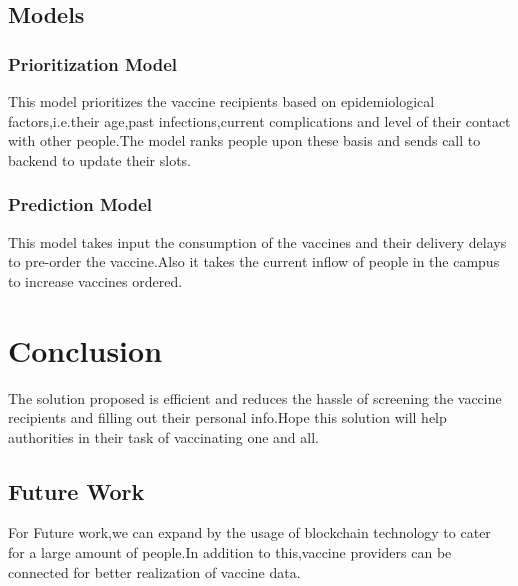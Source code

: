 \documentclass[10pt,twocolumn,letterpaper]{article}
\begin{document}
\subsection{Models}
\subsubsection{Prioritization Model}
This model prioritizes the vaccine recipients based on epidemiological factors,i.e.their age,past infections,current complications and level of their contact with other people.The model ranks people upon these basis and sends call to backend to update their slots.
\subsubsection{Prediction Model}
This model takes input the consumption of the vaccines and their delivery delays to pre-order the vaccine.Also it takes the current inflow of people in the campus to increase vaccines ordered.
\section{Conclusion}
The solution proposed is efficient and reduces the hassle of screening the vaccine recipients and filling out their personal info.Hope this solution will help authorities in their task of vaccinating one and all.
\subsection{Future Work}
For Future work,we can expand by the usage of blockchain technology to cater for a large amount of people.In addition to this,vaccine providers can be connected for better realization of vaccine data.

{\small


}
\end{document}
